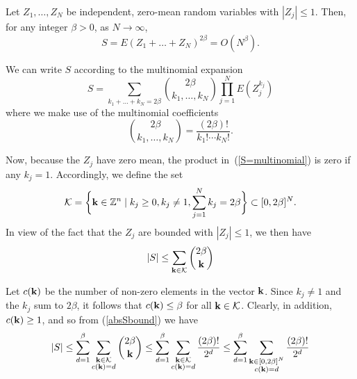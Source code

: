 \documentclass[journal]{IEEEtran}
\begin{document}
%
\small



\appendix

\begin{lemma} \label{lem:zero_mean_indepent_sum_bound}
  Let $Z_1, \dots, Z_N$ be independent, zero-mean random variables with $|Z_j|
  \leq 1$.  Then, for any integer $\beta > 0$, as $N \rightarrow \infty$,
\begin{equation*}
  S = E(Z_1 + \dots + Z_N)^{2 \beta} = O(N^\beta).
\end{equation*}
\end{lemma}

\begin{IEEEproof}
We can write $S$ according to the multinomial expansion
\begin{equation}
  S = \sum_{k_1 + \dots + k_N = 2 \beta} {2 \beta \choose k_1, \dots, k_N} \prod_{j=1}^N E(Z_j^{k_j})
  	\label{S=multinomial}
\end{equation}
where we make use of the multinomial coefficients
\begin{equation*}
  {2 \beta \choose k_1, \dots, k_N} = \frac{(2\beta)!}{k_1! \cdots k_N!}.
\end{equation*}

Now, because the $Z_j$ have zero mean, the product in~(\ref{S=multinomial}) is
zero if any $k_j = 1$.  Accordingly,  we define the set
\begin{equation*}
  \mathcal{K} = \bigg\{\mathbf{k} \in {\mathbb Z}^n \mid k_j \geq 0, k_j \neq 1, \sum_{j=1}^N k_j = 2 \beta\bigg\}
  \subset [0, 2 \beta]^N.
\end{equation*}
In view of the fact that the $Z_j$ are bounded with $|Z_j| \leq 1$, we then
have
\begin{equation}
  |S| \leq \sum_{\kbf \in \mathcal{K}} {2 \beta \choose \kbf}  \label{absSbound}
\end{equation}

Let $c(\mathbf{k})$ be the number of non-zero elements in the vector $\mathbf{k}$.  Since
$k_j \neq 1$ and the $k_j$ sum to $2 \beta$, it follows that $c(\mathbf{k}) \leq
\beta$ for all $\mathbf{k} \in \mathcal{K}$.  Clearly, in addition, $c(\mathbf{k}) \geq 1$,
and so from (\ref{absSbound}) we have
\begin{equation*}
  |S| \leq \sum_{d=1}^{\beta} \sum_{\substack{\mathbf{k} \in \mathcal{K} \\ c(\mathbf{k}) = d}} {2 \beta \choose \mathbf{k}}
	\leq \sum_{d=1}^{\beta} \sum_{\substack{\mathbf{k} \in \mathcal{K} \\ c(\mathbf{k}) = d}} \frac{(2 \beta)!}{2^d}
	\leq \sum_{d=1}^{\beta} \sum_{\substack{\mathbf{k} \in [0, 2 \beta]^N \\ c(\mathbf{k}) = d}} \frac{(2 \beta)!}{2^d}
\end{equation*}


\end{IEEEproof}
\end{document}
